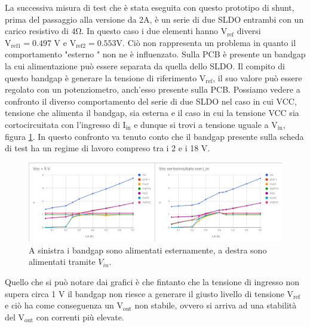 La successiva misura di test che è stata eseguita con questo prototipo di shunt, prima del passaggio alla versione da 2A, è un serie di due SLDO entrambi con un carico resistivo di $\mathrm{4 \Omega}$. In questo caso i due elementi hanno $\mathrm{V_{ref}}$ diversi $\mathrm{V_{ref1}=0.497}$ V e $\mathrm{V_{ref2}=0.553 V}$. 
Ciò non rappresenta un problema in quanto il comportamento "esterno " non ne è influenzato.
Sulla PCB è presente un bandgap la cui alimentazione può essere separata da quella dello SLDO. Il compito di questo bandgap è generare la tensione di riferimento $\mathrm{V_{ref}}$, il suo valore può essere regolato con un potenziometro, anch'esso presente sulla PCB.
Possiamo vedere a confronto il diverso comportamento del serie di due SLDO nel caso in cui VCC, tensione che alimenta il bandgap, sia esterna e il caso in cui la tensione VCC sia cortocircuitata con l'ingresso di $\mathrm{I_{in}}$ e dunque si trovi a tensione uguale a $\mathrm{V_{in}}$, figura \ref{SLDO5Serie}. In questo confronto va tenuto conto che il bandgap presente sulla scheda di test ha un regime di lavoro compreso tra  i 2 e i 18 V. 
\begin{figure}
\centering
\includegraphics[scale=.3]{Immagini/SLDO5Serie}
\caption{A sinistra i bandgap sono alimentati esternamente, a destra sono alimentati tramite $V_{in}$.}
\label{SLDO5Serie}
\end{figure}
Quello che si può notare dai grafici è che fintanto che la tensione di ingresso non supera circa 1 V il bandgap non riesce a generare il giusto livello di tensione $\mathrm{V_{ref}}$ e ciò ha come conseguenza un $\mathrm{V_{out}}$ non stabile, ovvero si arriva ad una stabilità del $\mathrm{V_{out}}$ con correnti più elevate.

